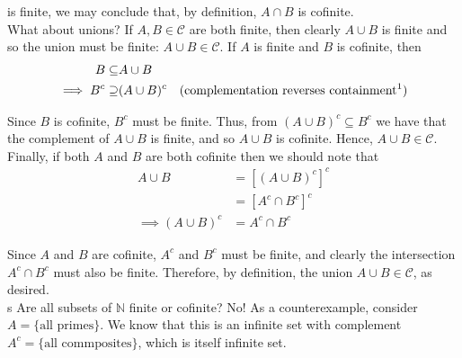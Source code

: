 \documentclass[12pt]{article}
\newlength\tindent
\renewcommand{\indent}{\hspace*{\tindent}}
\newcommand{\N}{\mathbb N}
\begin{document}
is finite, we may conclude that, by definition, $A \cap B$ is cofinite. \\

\indent What about unions? If $A, B \in \mathcal C$ are both finite, then clearly $A \cup B$ is finite and so the union must be finite: $A \cup B \in \mathcal C$. If $A$ is finite and $B$ is cofinite, then 
\begin{align*}
	B \subseteq& A \cup B \\
	\implies B^c \supseteq&  (A \cup B)^c \quad \text{(complementation reverses containment\footnotemark)}
\end{align*}

\indent  Since $B$ is cofinite, $B^c$ must be finite. Thus, from $(A\cup B)^c \subseteq B^c$ we have that the complement of $A\cup B$ is finite, and so $A\cup B$ is cofinite. Hence, $A\cup B \in \mathcal C$. Finally, if both $A$ and $B$ are both cofinite then we should note that
\begin{align*}
	A\cup B &= \left[ \left( A \cup B \right)^c \right]^c \\
		&= \left[ A^c \cap B^c \right]^c \\
		\implies (A \cup B)^c &= A^c \cap B^c
\end{align*}

Since $A$ and $B$ are cofinite, $A^c$ and $B^c$ must be finite, and clearly the intersection $A^c \cap B^c$ must also be finite. Therefore, by definition, the union $A \cup B \in \mathcal C$, as desired. \\
s
\indent Are all subsets of $\N$ finite or cofinite? No! As a counterexample, consider $A = \{\text{all primes}\}$. We know that this is an infinite set with complement $A^c = \{\text{all commposites}\}$, which is itself infinite set.
\end{document}

